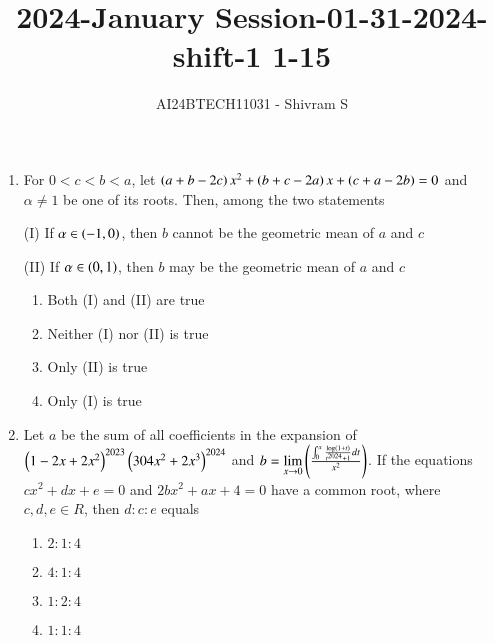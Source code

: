 \documentclass[journal]{IEEEtran}
\begin{document}

\onecolumn

\title{2024-January Session-01-31-2024-shift-1 1-15}
\author{AI24BTECH11031 - Shivram S}
\maketitle
\bigskip

\renewcommand{\thefigure}{\theenumi}
\renewcommand{\thetable}{\theenumi}

\begin{enumerate}


    
    \item For $0 < c < b < a$, let $\left(a + b - 2c\right)x^2 + \left(b + c - 2a\right)x
    + \left(c + a - 2b\right) = 0$ and $\alpha \ne 1$ be one of its roots.
    Then, among the two statements
    
    (I) If $\alpha \in \left(-1, 0\right)$, then $b$ cannot be the geometric
    mean of $a$ and $c$
    
    (II) If $\alpha \in \left(0, 1\right)$, then $b$ may be the geometric
    mean of $a$ and $c$

    \begin{multicols}{2}
\begin{enumerate}

        \item Both (I) and (II) are true
        \item Neither (I) nor (II) is true
        \item Only (II) is true
        \item Only (I) is true
    \end{enumerate}
\end{multicols}

    \item Let $a$ be the sum of all coefficients in the
        expansion of $\left(1 - 2x + 2x^2\right)^{2023} \left(3 0 4x^2+2x^3\right)^{2024}$
        and $b = \lim\limits_{x \to 0} \left(\frac{\int_0^x \frac{\log\left(1+t\right)}{t^{2024} + 1} dt} {x^2}\right)$.
    If the equations $cx^2 + dx + e = 0$ and $2bx^2 + ax + 4 = 0$
    have a common root, where $c, d, e \in R$, then $d : c : e$ equals
    
    \begin{multicols}{4}
\begin{enumerate}

        \item $2:1:4$
        \item $4:1:4$
        \item $1:2:4$
        \item $1:1:4$
    \end{enumerate}
\end{multicols}


\end{enumerate}
\end{document}
